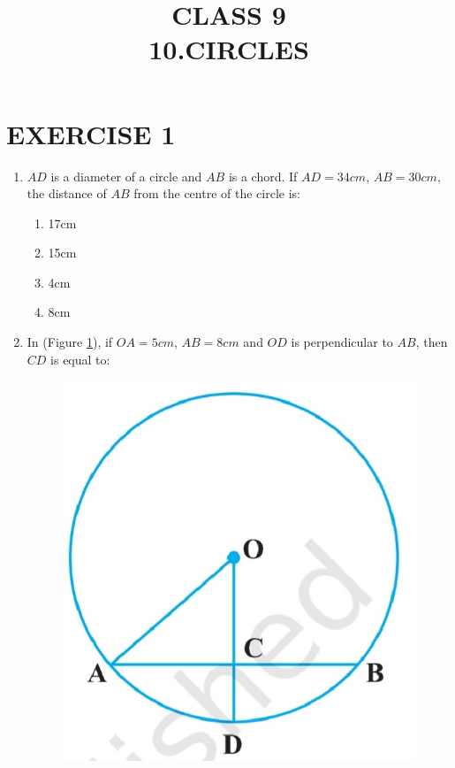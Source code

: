 \documentclass{article}
\begin{document}
 
\title{CLASS 9\\10.CIRCLES}
\date{}
\maketitle
\section{EXERCISE 1}
\begin{enumerate}
\item $AD$ is a diameter of a circle and $AB$ is a chord. If $AD = 34 cm$, $AB = 30 cm$, the distance of $AB$ from the centre of the circle is:
\begin{enumerate}
\item 17cm
\item 15cm
\item 4cm
\item 8cm
\end{enumerate}
\item In (Figure \ref{fig:10.3}), if $OA = 5cm$, $AB = 8cm$ and $OD$ is perpendicular to $AB$, then $CD$ is equal to:
\begin{figure}[H]
\centering
\includegraphics[width=\columnwidth]{figs/10.3.jpg}
\caption{}
\label{fig:10.3}
\end{figure}

\end{enumerate}
\end{document}
